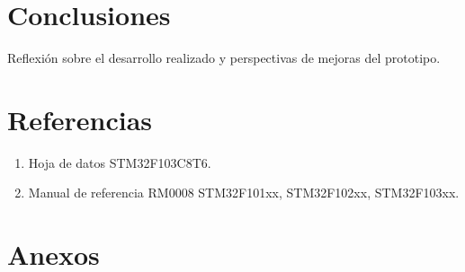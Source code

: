 \documentclass[12pt]{article}
\begin{document}
\section{Conclusiones}
Reflexión sobre el desarrollo realizado y perspectivas de mejoras del prototipo.

\section{Referencias}
\begin{enumerate}
    \item Hoja de datos STM32F103C8T6.
    \item Manual de referencia RM0008 STM32F101xx, STM32F102xx, STM32F103xx.
\end{enumerate}

\appendix
\section{Anexos}
\end{document}
